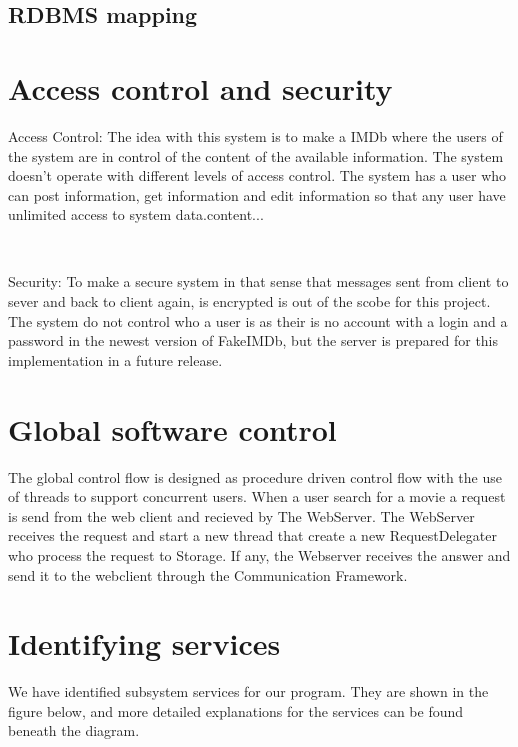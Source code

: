 \subsection{RDBMS mapping}

\section{Access control and security}
\begin{itemize}
Access Control: The idea with this system is to make a IMDb where the users of the system are in control of the content of the available information. The system doesn't operate with different levels of access control. The system has a user who can post information, get information and edit information so that any user have unlimited access to system data.content...
\end{itemize}\\
\begin{itemize}
Security: To make a secure system in that sense that messages sent from client to sever and back to client again, is encrypted is out of the scobe for this project.\\
The system do not control who a user is as their is no account with a login and a password in the newest version of FakeIMDb, but the server is prepared for this implementation in a future release.
\end{itemize}

\section{Global software control}
The global control flow is designed as procedure driven control flow with the use of threads to support concurrent users. When a user search for a movie a request is send from the web client and recieved by The WebServer. The WebServer receives the request and start a new thread that create a new RequestDelegater who process the request to Storage. If any, the Webserver receives the answer and send it to the webclient through the Communication Framework.

\section{Identifying services}
We have identified subsystem services for our program. They are shown in the figure below, and more detailed explanations for the services can be found beneath the diagram.

